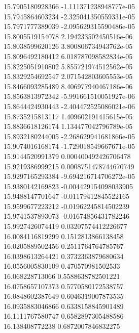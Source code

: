 {15.7905180928366 -1.111371238948777e-05 \\
15.7945864603234 -2.325041350559331e-05 \\
15.7971777389039 -2.095629315590486e-05 \\
15.8005519154078 2.194233502450516e-06 \\
15.8038599620126 3.800806734943762e-05 \\
15.8096492180412 6.018787098582834e-05 \\
15.8225051910802 5.855721974512562e-05 \\
15.8329254692547 2.071542803605553e-05 \\
15.8466093285489 8.406977940467186e-06 \\
15.8563813972342 -5.991661510051927e-06 \\
15.8644424930443 -2.404472525086021e-06 \\
15.8735215813117 1.409602191415615e-05 \\
15.8836618126174 1.134477042796789e-05 \\
15.8932180244005 -2.268629941681866e-05 \\
15.9074016168174 -1.729018549667671e-05 \\
15.9144520991379 0.000400492426706478 \\
15.9219386999215 0.0008751478744670749 \\
15.9297165293384 -9.694216714706272e-05 \\
15.9380142169823 -0.004429154098033905 \\
15.9488147701647 -0.01179412845522165 \\
15.9599677223212 -0.01962245814502239 \\
15.9741537893073 -0.01674856431782246 \\
15.9927426074419 0.03207574412226677 \\
16.0084116819299 0.1512813866138458 \\
16.0205889502456 0.2511764764785767 \\
16.0398613264421 0.3732363879680634 \\
16.0556005830109 0.470570981502533 \\
16.068228713066 0.5588638782501221 \\
16.0758657107373 0.5770580172538757 \\
16.0848602387649 0.6046319007873535 \\
16.0935883046866 0.6338158845901489 \\
16.1111767580747 0.6582897305488586 \\
16.138408772238 0.6872007846832275 \\
}
